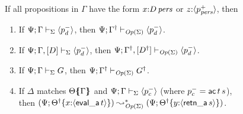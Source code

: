 \begin{theorem}\label{thm:opercomp}
If all propositions in $\Gamma$ have the form 
$x{:}{D}\,{{\it pers}}$ or $z{:}\langle {p^+_{{\it pers}}} \rangle$, then
\begin{enumerate}
\item  
If ${\Psi}; {\Gamma} \vdash_{\Sigma} {\langle {p^-_d} \rangle}$,
then ${\Psi}; {{{\Gamma}^\dag}} \vdash_{{\it Op}({\Sigma})} {\langle {p^-_d} \rangle}$.
\item  
If ${\Psi}; {\Gamma, [D]} \vdash_{\Sigma} {\langle {p^-_d} \rangle}$,
then ${\Psi}; {{{\Gamma}^\dag}, [{{D}^\dag}]} \vdash_{{\it Op}({\Sigma})} {\langle {p^-_d} \rangle}$.
\item  
If ${\Psi}; {\Gamma} \vdash_{\Sigma} {G}$,
then ${\Psi}; {{{\Gamma}^\dag}} \vdash_{{\it Op}({\Sigma})} {{{G}^\dag}}$.
\item
If $\Delta$ matches ${\Theta}\mbox{$\{\hspace{-4pt}\{$}{\Gamma}\mbox{$\}\hspace{-4pt}\}$}$ 
and ${\Psi}; {\Gamma} \vdash_{\Sigma} {\langle {p^-_c} \rangle}$
(where $p^-_c = {\sf ac}\,t\,s$),\\
then
$(\Psi; {{{\Theta}^\dag}}\{{x{:}\langle {{\sf eval\_a}\,t} \rangle}\}) 
  \leadsto^*_{{\it Op}({\Sigma})}
 (\Psi; {{{\Theta}^\dag}}\{{y{:}\langle {{\sf retn\_a}\,s} \rangle}\})$.
\end{enumerate}
\end{theorem}

